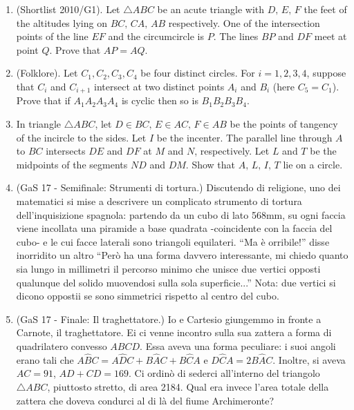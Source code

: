 \documentclass[a4paper]{article}
\theoremstyle{remark}
\theoremstyle{definition}
\begin{document}
\begin{enumerate}
\item (Shortlist 2010/G1). Let $ \triangle ABC $ be an acute triangle with $ D,\, E,\, F $ the feet
of the altitudes lying on $ BC,\, CA,\, AB $ respectively. One of the intersection points of the
line $ EF $ and the circumcircle is $ P $. The lines $ BP $ and $ DF $ meet at point $ Q $. Prove that
$ AP = AQ $.

\item (Folklore). Let $ C_1, C_2, C_3, C_4 $ be four distinct circles. For $ i = 1, 2, 3, 4 $,
suppose that $ C_i  $ and $ C_{i+1}  $ intersect at two distinct points $ A_i $ and $ B_i $ (here $ C_5 = C_1 $). Prove that if $ A_1A_2A_3A_4 $ is cyclic then so is $ B_1B_2B_3B_4 $.

\item In triangle $ \triangle ABC $, let $ D \in  BC ,\, E \in  AC,\, F  \in  AB$ be the points of tangency of the
incircle to the sides. Let $ I $ be the incenter. The parallel line through $ A $ to $ BC $ intersects
$ DE $ and $ DF $ at $ M $ and $ N $, respectively. Let $ L $ and $ T $ be the midpoints of the segments
$ ND $ and $ DM $. Show that $ A,\, L,\, I,\, T $ lie on a circle.

\item (GaS 17 - Semifinale: Strumenti di tortura.)
Discutendo di religione, uno dei matematici si mise a descrivere un complicato strumento di tortura dell’inquisizione
spagnola: partendo da un cubo di lato 568mm, su ogni faccia viene incollata una piramide a base quadrata -coincidente
con la faccia del cubo- e le cui facce laterali sono triangoli equilateri. “Ma è orribile!” disse inorridito un altro “Però ha
una forma davvero interessante, mi chiedo quanto sia lungo in millimetri il percorso minimo che unisce due vertici opposti
qualunque del solido muovendosi sulla sola superficie...” Nota: due vertici si dicono oppostii se sono simmetrici rispetto al
centro del cubo.

\item (GaS 17 - Finale: Il traghettatore.) 
Io e Cartesio giungemmo in fronte a Carnote, il traghettatore. Ei ci venne incontro sulla sua zattera a forma di quadrilatero
convesso $ ABCD $. Essa aveva una forma peculiare: i suoi angoli erano tali che $ A\hat{B}C = A\hat{D}C + B\hat{A}C + B\hat{C}A $ e
$ D\hat{C}A = 2B\hat{A}C $. Inoltre, si aveva $ AC = 91 $, $ AD + CD = 169 $. Ci ordinò di sederci all’interno del triangolo $ \triangle ABC $,
piuttosto stretto, di area 2184. Qual era invece l’area totale della zattera che doveva condurci al di là del fiume
Archimeronte?


\end{enumerate}
\end{document}
